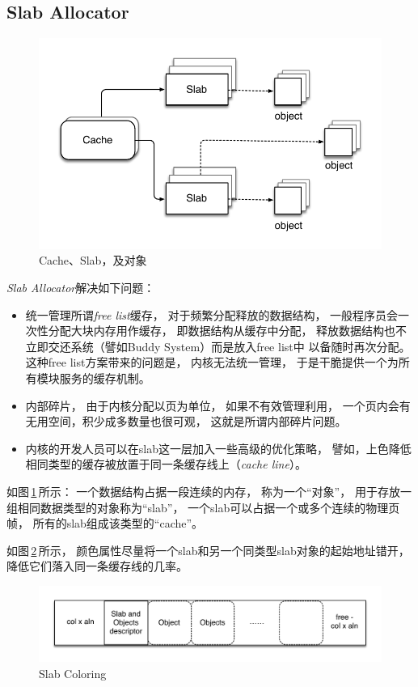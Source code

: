 \subsection{Slab Allocator}
\begin{figure}[!ht]
\centering
\includegraphics[scale=0.8]{fig/slab}
\caption{Cache、Slab，及对象}
\label{fig:slab}
\end{figure}

{\em Slab Allocator}解决如下问题：
\begin{itemize}
  \item 统一管理所谓{\em free list}缓存，
    对于频繁分配释放的数据结构，
    一般程序员会一次性分配大块内存用作缓存，
    即数据结构从缓存中分配，
    释放数据结构也不立即交还系统（譬如Buddy System）而是放入free list中%
    以备随时再次分配。
    这种free list方案带来的问题是，
    内核无法统一管理，
    于是干脆提供一个为所有模块服务的缓存机制。

  \item 内部碎片，
    由于内核分配以页为单位，
    如果不有效管理利用，
    一个页内会有无用空间，积少成多数量也很可观，
    这就是所谓内部碎片问题。

  \item 内核的开发人员可以在slab这一层加入一些高级的优化策略，
    譬如，上色降低相同类型的缓存被放置于同一条缓存线上（{\em cache line}）。
\end{itemize}

如图\,\ref{fig:slab}\,所示：
一个数据结构占据一段连续的内存，
称为一个“对象”，
用于存放一组相同数据类型的对象称为“slab”，
一个slab可以占据一个或多个连续的物理页帧，
所有的slab组成该类型的“cache”。

如图\,\ref{fig:slabc}\,所示，
颜色属性尽量将一个slab和另一个同类型slab对象的起始地址错开，
降低它们落入同一条缓存线的几率。

\begin{figure}[!ht]
\centering
\includegraphics[scale=0.72]{fig/slab_color}
\caption{Slab Coloring}
\label{fig:slabc}
\end{figure}
